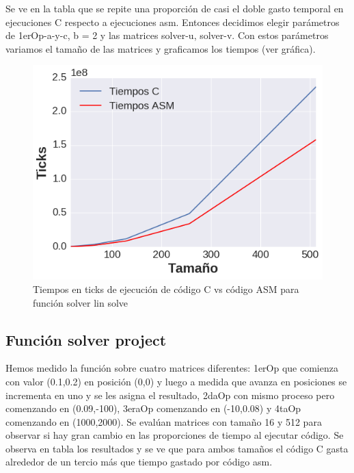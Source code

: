  Se ve en la tabla que se repite una proporción de casi el doble gasto temporal en ejecuciones C respecto a ejecuciones asm. Entonces decidimos elegir parámetros de 1erOp-a-y-c, b = 2 y las matrices solver-u, solver-v. Con estos parámetros variamos el tamaño de las matrices y graficamos los tiempos (ver gráfica).
\begin{figure}[h]

\centering
\includegraphics[scale=0.6] {solver_lin_solve}
  
 \caption{Tiempos en ticks de ejecución de código C vs código ASM para función solver lin solve}
\end{figure} 

\subsection{Función solver project}
Hemos medido la función sobre cuatro matrices diferentes: 1erOp que comienza con valor (0.1,0.2) en posición (0,0) y luego a medida que avanza en posiciones se incrementa en uno y se les asigna el resultado, 2daOp con mismo proceso pero comenzando en (0.09,-100), 3eraOp comenzando en (-10,0.08) y 4taOp comenzando en (1000,2000). Se evalúan matrices con tamaño 16 y 512 para observar si hay gran cambio en las proporciones de tiempo al ejecutar código. Se observa en tabla los resultados y se ve que 
para ambos tamaños el código C gasta alrededor de un tercio más que tiempo gastado por código asm. 
 


